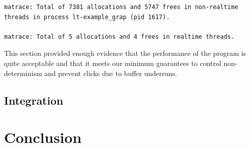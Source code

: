 \begin{mynote}
\label{note:matrace-output}\footnotesize
\begin{verbatim}
matrace: Total of 7381 allocations and 5747 frees in non-realtime 
threads in process lt-example_grap (pid 1617).

matrace: Total of 5 allocations and 4 frees in realtime threads.
\end{verbatim}
\end{mynote}

This section provided enough evidence that the performance of the
program is quite acceptable and that it meets our minimum guarantees
to control non-determinism and prevent clicks due to buffer underruns.

\subsection{Integration}
\label{sec:graph-integration}

\section{Conclusion}

